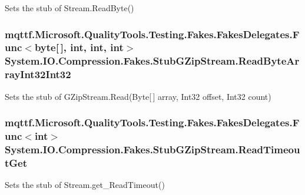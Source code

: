 Sets the stub of Stream.\-Read\-Byte()

\hypertarget{class_system_1_1_i_o_1_1_compression_1_1_fakes_1_1_stub_g_zip_stream_ace1b6bcbfef44f85f86132abb325a1ae}{
\subsubsection[{Read\-Byte\-Array\-Int32\-Int32}]{\setlength{\rightskip}{0pt plus 5cm}mqttf.\-Microsoft.\-Quality\-Tools.\-Testing.\-Fakes.\-Fakes\-Delegates.\-Func$<$byte\mbox{[}$\,$\mbox{]}, int, int, int$>$ System.\-I\-O.\-Compression.\-Fakes.\-Stub\-G\-Zip\-Stream.\-Read\-Byte\-Array\-Int32\-Int32}}\label{class_system_1_1_i_o_1_1_compression_1_1_fakes_1_1_stub_g_zip_stream_ace1b6bcbfef44f85f86132abb325a1ae}


Sets the stub of G\-Zip\-Stream.\-Read(\-Byte\mbox{[}$\,$\mbox{]} array, Int32 offset, Int32 count)

\hypertarget{class_system_1_1_i_o_1_1_compression_1_1_fakes_1_1_stub_g_zip_stream_a7e2c731fc2fbb1b9f0ab8d53e19c6b5e}{
\subsubsection[{Read\-Timeout\-Get}]{\setlength{\rightskip}{0pt plus 5cm}mqttf.\-Microsoft.\-Quality\-Tools.\-Testing.\-Fakes.\-Fakes\-Delegates.\-Func$<$int$>$ System.\-I\-O.\-Compression.\-Fakes.\-Stub\-G\-Zip\-Stream.\-Read\-Timeout\-Get}}\label{class_system_1_1_i_o_1_1_compression_1_1_fakes_1_1_stub_g_zip_stream_a7e2c731fc2fbb1b9f0ab8d53e19c6b5e}


Sets the stub of Stream.\-get\-\_\-\-Read\-Timeout()

